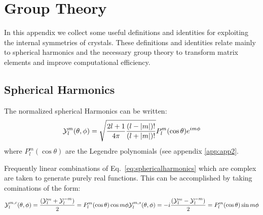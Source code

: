 \chapter{Group Theory}
\label{appen:grouptheory}
In this appendix we collect some useful definitions and identities
for exploiting the internal symmetries of crystals.
These definitions and identities relate mainly to spherical harmonics 
and the necessary group theory to transform matrix elements 
and improve computational efficiency. 

\section{Spherical Harmonics}
The normalized spherical Harmonics can be written:
%
\begin{equation}
\label{eq:sphericalharmonics}
\mathcal{Y}_{l}^{m}(\theta,\phi) = \sqrt{\frac{2l+1}{4\pi}\frac{(l-|m|)!}{(l+|m|)!}}P_{l}^{m}(\cos\theta)e^{im\phi}
\end{equation}
%
where $P_{l}^{m}(\cos\theta)$ are the Legendre polynomials (see appendix \ref{app:app2}.

Frequently linear combinations of Eq.~\ref{eq:sphericalharmonics} which are complex 
are taken to generate purely real functions. This can be accomplished by taking cominations of the form:
%
\begin{equation}
\mathcal{Y}_{l}^{m,c}(\theta,\phi) = \frac{(\mathcal{Y}^{m}_{l} + \mathcal{Y}_{l}^{-m})}{2} = P_{l}^{m}(\cos\theta)\cos m\phi \\
\mathcal{Y}_{l}^{m,s}(\theta,\phi) = -i\frac{(\mathcal{Y}^{m}_{l} - \mathcal{Y}_{l}^{-m})}{2} = P_{l}^{m}(\cos\theta)\sin m\phi
\end{equation}
%

